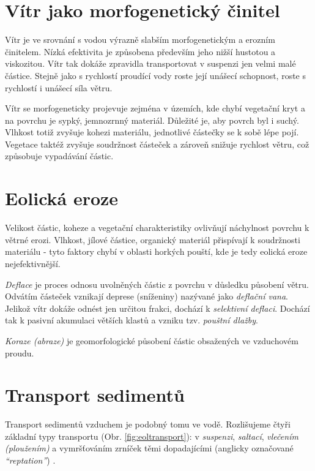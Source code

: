 \section{Vítr jako morfogenetický činitel}
Vítr je ve srovnání s vodou výrazně slabším morfogenetickým a erozním činitelem. Nízká efektivita je způsobena především jeho nižší hustotou a viskozitou. Vítr tak dokáže zpravidla transportovat v suspenzi jen velmi malé částice. Stejně jako s rychlostí proudící vody roste její unášecí schopnost, roste s rychlostí i unášecí síla větru.

Vítr se morfogeneticky projevuje zejména v územích, kde chybí vegetační kryt a na povrchu je sypký, jemnozrnný materiál. Důležité je, aby povrch byl i suchý. Vlhkost totiž zvyšuje kohezi materiálu, jednotlivé částečky se k sobě lépe pojí. Vegetace taktéž zvyšuje soudržnost částeček a zároveň snižuje rychlost větru, což způsobuje vypadávání částic.
	
%
%
%

\section{Eolická eroze}
Velikost částic, koheze a vegetační charakteristiky ovlivňují náchylnost povrchu k větrné erozi. Vlhkost, jílové částice, organický materiál přispívají k soudržnosti materiálu - tyto faktory chybí v oblasti horkých pouští, kde je tedy eolická eroze nejefektivnější.

\emph{Deflace} je proces odnosu uvolněných částic z povrchu v důsledku působení větru. Odvátím částeček vznikají deprese (sníženiny) nazývané jako \emph{deflační vana}. Jelikož vítr dokáže odnést jen určitou frakci, dochází k \emph{selektivní deflaci}. Dochází tak k pasivní akumulaci větších klastů a vzniku tzv. \emph{pouštní dlažby}.

\emph{Koraze (abraze)} je geomorfologické působení částic obsažených ve vzduchovém proudu.

\section{Transport sedimentů}
Transport sedimentů vzduchem je podobný tomu ve vodě. Rozlišujeme čtyři základní typy transportu (Obr. \ref{fig:eoltransport}): v \emph{suspenzi}, \emph{saltací}, \emph{vlečením (ploužením)} a vymršťováním zrníček těmi dopadajícími (anglicky označované \emph{\enquote{reptation}}) \parencite{livingstoneAeolianGeomorphologyNew2019}. 

